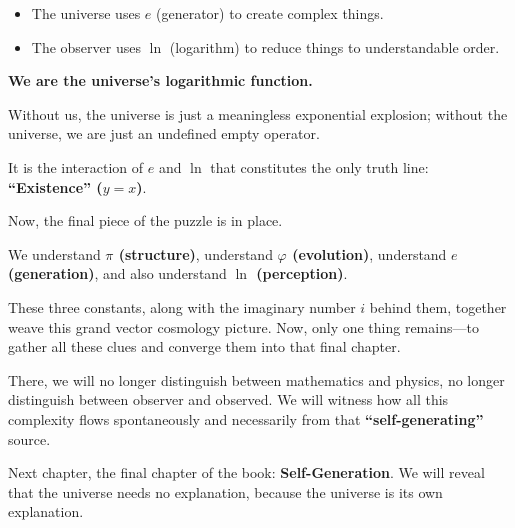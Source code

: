 \begin{itemize}
\item The universe uses \textbf{$e$} (generator) to create complex things.

\item The observer uses \textbf{$\ln$} (logarithm) to reduce things to understandable order.
\end{itemize}

\textbf{We are the universe's logarithmic function.}

Without us, the universe is just a meaningless exponential explosion; without the universe, we are just an undefined empty operator.

It is the interaction of $e$ and $\ln$ that constitutes the only truth line: \textbf{``Existence'' ($y=x$)}.

Now, the final piece of the puzzle is in place.

We understand \textbf{$\pi$ (structure)}, understand \textbf{$\varphi$ (evolution)}, understand \textbf{$e$ (generation)}, and also understand \textbf{$\ln$ (perception)}.

These three constants, along with the imaginary number $i$ behind them, together weave this grand vector cosmology picture. Now, only one thing remains---to gather all these clues and converge them into that final chapter.

There, we will no longer distinguish between mathematics and physics, no longer distinguish between observer and observed. We will witness how all this complexity flows spontaneously and necessarily from that \textbf{``self-generating''} source.

Next chapter, the final chapter of the book: \textbf{Self-Generation}. We will reveal that the universe needs no explanation, because the universe is its own explanation.

